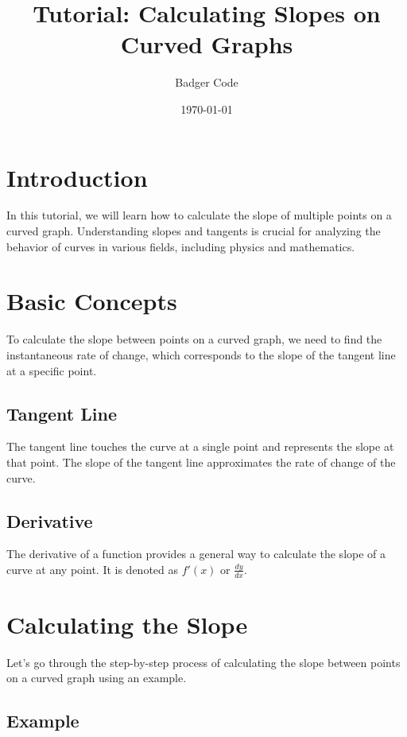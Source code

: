 \documentclass{article}
\title{Tutorial: Calculating Slopes on Curved Graphs}
\author{Badger Code}
\date{\today}
\begin{document}
\maketitle

\section{Introduction}

In this tutorial, we will learn how to calculate the slope of multiple points on a curved graph. Understanding slopes and tangents is crucial for analyzing the behavior of curves in various fields, including physics and mathematics.

\section{Basic Concepts}

To calculate the slope between points on a curved graph, we need to find the instantaneous rate of change, which corresponds to the slope of the tangent line at a specific point.

\subsection{Tangent Line}

The tangent line touches the curve at a single point and represents the slope at that point. The slope of the tangent line approximates the rate of change of the curve.

\subsection{Derivative}

The derivative of a function provides a general way to calculate the slope of a curve at any point. It is denoted as $f'(x)$ or $\frac{dy}{dx}$.

\section{Calculating the Slope}

Let's go through the step-by-step process of calculating the slope between points on a curved graph using an example.

\subsection{Example}
\end{document}
